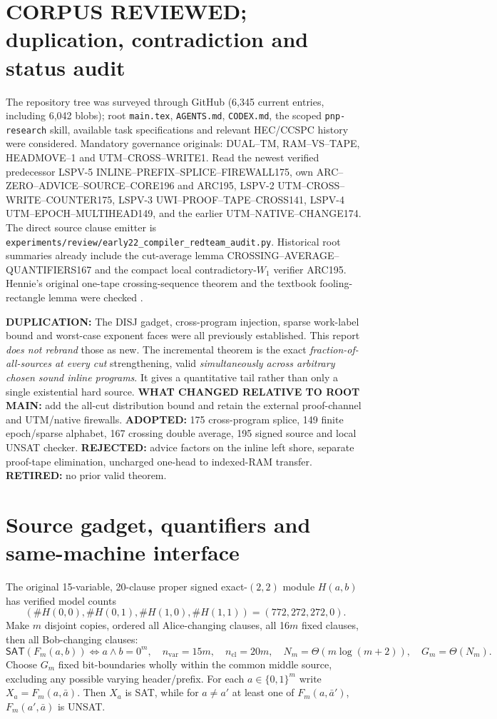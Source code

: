 \documentclass[11pt]{article}
\newcommand{\SAT}{\mathsf{SAT}}
\begin{document}
\section{CORPUS REVIEWED; duplication, contradiction and status audit}
The repository tree was surveyed through GitHub (6,345 current
entries, including 6,042 blobs); root \texttt{main.tex},
\texttt{AGENTS.md}, \texttt{CODEX.md}, the scoped
\texttt{pnp-research} skill, available task specifications
and relevant HEC/CCSPC history were considered.
Mandatory governance originals: DUAL--TM,
RAM--VS--TAPE, HEADMOVE--1 and UTM--CROSS--WRITE1.
Read the newest verified predecessor
LSPV-5 INLINE--PREFIX--SPLICE--FIREWALL175, own
ARC--ZERO--ADVICE--SOURCE--CORE196 and ARC195,
LSPV-2 UTM--CROSS--WRITE--COUNTER175,
LSPV-3 UWI--PROOF--TAPE--CROSS141,
LSPV-4 UTM--EPOCH--MULTIHEAD149, and the earlier
UTM--NATIVE--CHANGE174. The direct source clause emitter is
\texttt{experiments/review/early22\_compiler\_redteam\_audit.py}.
Historical root summaries already include the cut-average
lemma CROSSING--AVERAGE--QUANTIFIERS167 and the compact
local contradictory-$W_1$ verifier ARC195. Hennie's original
one-tape crossing-sequence theorem and the textbook
fooling-rectangle lemma were checked \cite{hennie,kn}.

\textbf{DUPLICATION:} The DISJ gadget, cross-program injection,
sparse work-label bound and worst-case exponent faces were
all previously established. This report \emph{does not rebrand}
those as new. The incremental theorem is the exact
\emph{fraction-of-all-sources at every cut} strengthening,
valid \emph{simultaneously across arbitrary chosen sound
inline programs}. It gives a quantitative tail rather
than only a single existential hard source.
\textbf{WHAT CHANGED RELATIVE TO ROOT MAIN:}
add the all-cut distribution bound and retain the external
proof-channel and UTM/native firewalls.
\textbf{ADOPTED:} 175 cross-program splice, 149 finite
epoch/sparse alphabet, 167 crossing double average,
195 signed source and local UNSAT checker.
\textbf{REJECTED:} advice factors on the inline left shore,
separate proof-tape elimination, uncharged one-head to
indexed-RAM transfer. \textbf{RETIRED:} no prior valid theorem.

\section{Source gadget, quantifiers and same-machine interface}
The original 15-variable, 20-clause proper signed
exact-$(2,2)$ module $H(a,b)$ has verified model counts
\[
(\#H(0,0),\#H(0,1),\#H(1,0),\#H(1,1))
=(772,272,272,0).
\]
Make $m$ disjoint copies, ordered all Alice-changing clauses,
all 16$m$ fixed clauses, then all Bob-changing clauses:
\[
 \SAT(F_m(a,b))\iff a\wedge b=0^m,\quad
 n_{\mathrm{var}}=15m,\quad n_{\mathrm{cl}}=20m,\quad
 N_m=\Theta(m\log(m+2)),\quad G_m=\Theta(N_m).
\]
Choose $G_m$ fixed bit-boundaries wholly within the common
middle source, excluding any possible varying header/prefix.
For each $a\in\{0,1\}^m$ write $X_a=F_m(a,\bar a)$.
Then $X_a$ is SAT, while for $a\ne a'$ at least one of
$F_m(a,\bar a')$, $F_m(a',\bar a)$ is UNSAT.
\end{document}
